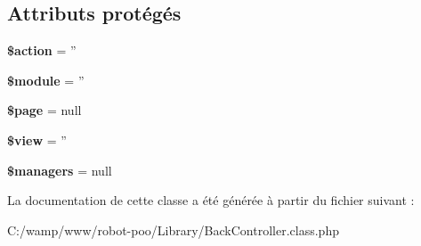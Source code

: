 \subsection*{Attributs protégés}
\begin{DoxyCompactItemize}
\item 
\hypertarget{class_library_1_1_back_controller_aa698a3e72116e8e778be0e95d908ee30}{{\bfseries \$action} = ''}\label{class_library_1_1_back_controller_aa698a3e72116e8e778be0e95d908ee30}

\item 
\hypertarget{class_library_1_1_back_controller_ac531301c55a8d8b6c7613597218ff482}{{\bfseries \$module} = ''}\label{class_library_1_1_back_controller_ac531301c55a8d8b6c7613597218ff482}

\item 
\hypertarget{class_library_1_1_back_controller_a0a44e6760141442bb439b1ab1395d8ff}{{\bfseries \$page} = null}\label{class_library_1_1_back_controller_a0a44e6760141442bb439b1ab1395d8ff}

\item 
\hypertarget{class_library_1_1_back_controller_acccf2eac8663e0cebe8101e90fbab089}{{\bfseries \$view} = ''}\label{class_library_1_1_back_controller_acccf2eac8663e0cebe8101e90fbab089}

\item 
\hypertarget{class_library_1_1_back_controller_a36678d0596f4933e4c00d74488a7f023}{{\bfseries \$managers} = null}\label{class_library_1_1_back_controller_a36678d0596f4933e4c00d74488a7f023}

\end{DoxyCompactItemize}


La documentation de cette classe a été générée à partir du fichier suivant \+:\begin{DoxyCompactItemize}
\item 
C\+:/wamp/www/robot-\/poo/\+Library/Back\+Controller.\+class.\+php\end{DoxyCompactItemize}

